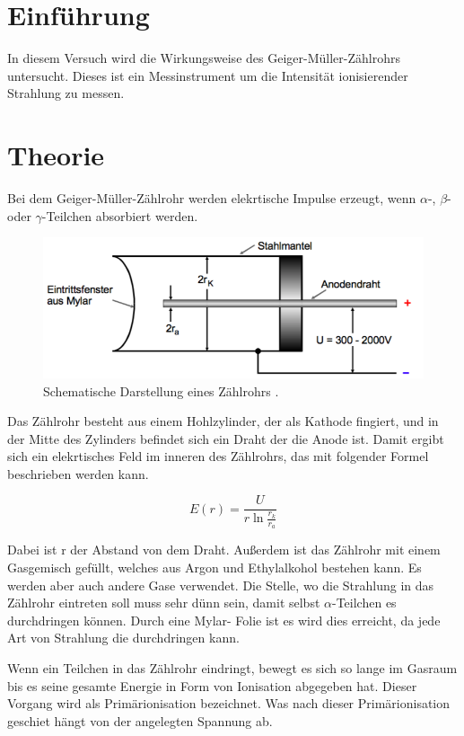 \section{Einführung}
In diesem Versuch wird die Wirkungsweise des Geiger-Müller-Zählrohrs untersucht.
Dieses ist ein Messinstrument um die Intensität ionisierender Strahlung zu messen.

\section{Theorie}

Bei dem Geiger-Müller-Zählrohr werden elekrtische Impulse erzeugt, wenn $\alpha$-,
$\beta$- oder $\gamma$-Teilchen absorbiert werden.

\begin{figure}[H]
  \centering
  \includegraphics[width=\textwidth]{content/Zaehlrohr.png}
  \caption{Schematische Darstellung eines Zählrohrs \cite{1}.}
  \label{abb:1}
\end{figure}

Das Zählrohr besteht aus einem Hohlzylinder, der als Kathode fingiert, und in der
Mitte des Zylinders befindet sich ein Draht der die Anode ist. Damit ergibt sich
ein elekrtisches Feld im inneren des Zählrohrs, das mit folgender Formel beschrieben
werden kann.

\begin{equation*}
  E(r) = \frac{U}{r \ln{\frac{r_k}{r_a}}}
\end{equation*}

Dabei ist r der Abstand von dem Draht. Außerdem ist das Zählrohr mit einem Gasgemisch
gefüllt, welches aus Argon und Ethylalkohol bestehen kann. Es werden aber auch andere
Gase verwendet. Die Stelle, wo die Strahlung in das Zählrohr eintreten soll muss sehr
dünn sein, damit selbst $\alpha$-Teilchen es durchdringen können. Durch eine Mylar-
Folie ist es wird dies erreicht, da jede Art von Strahlung die durchdringen kann.

Wenn ein Teilchen in das Zählrohr eindringt, bewegt es sich so lange im Gasraum bis
es seine gesamte Energie in Form von Ionisation abgegeben hat. Dieser Vorgang wird als
Primärionisation bezeichnet. Was nach dieser Primärionisation geschiet hängt von der
angelegten Spannung ab.

